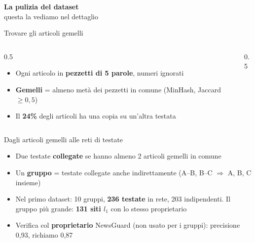 \documentclass[aspectratio=169]{beamer}
\newcommand{\hl}[1]{\textbf{#1}}
\newcommand{\divider}[2]{%
  \begin{frame}[plain]
    \vfill
    \begin{center}
      {\color{dividerblue}\Huge\textbf{#1}}\\[0.8em]
      {\large #2}
    \end{center}
    \vfill
  \end{frame}}
\begin{document}
\divider{La pulizia del dataset}{questa la vediamo nel dettaglio}

\begin{frame}{Trovare gli articoli gemelli}
  \begin{columns}[c]
    \begin{column}{0.5\textwidth}
      \begin{itemize}[<+->]
        \setlength\itemsep{0.7em}
        \item Ogni articolo in \hl{pezzetti di 5 parole}, numeri ignorati
        \item \hl{Gemelli} = almeno met\`a dei pezzetti in comune (MinHash, Jaccard $\geq 0{,}5$)
        \item Il \hl{24\%} degli articoli ha una copia su un'altra testata
      \end{itemize}
    \end{column}
    \begin{column}{0.5\textwidth}
    \end{column}
  \end{columns}
\end{frame}

\begin{frame}{Dagli articoli gemelli alle reti di testate}
  \vfill
  \begin{itemize}[<+->]
    \setlength\itemsep{0.8em}
    \item Due testate \hl{collegate} se hanno almeno 2 articoli gemelli in comune
    \item Un \hl{gruppo} = testate collegate anche indirettamente (A--B, B--C $\Rightarrow$ A, B, C insieme)
    \item Nel primo dataset: 10 gruppi, \hl{236 testate} in rete, 203 indipendenti. Il gruppo pi\`u grande: \hl{131 siti $l_1$} con lo stesso proprietario
    \item Verifica col \hl{proprietario} NewsGuard (non usato per i gruppi): precisione 0,93, richiamo 0,87
  \end{itemize}
  \vfill
\end{frame}
\end{document}
